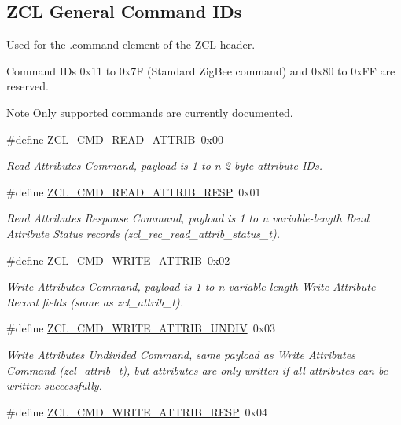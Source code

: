 \subsection*{Z\-C\-L General Command I\-Ds}
\label{_amgrp27eea603d65ab29a11d175579fcb3efa}%
Used for the .command element of the Z\-C\-L header.

Command I\-Ds 0x11 to 0x7\-F (Standard Zig\-Bee command) and 0x80 to 0x\-F\-F are reserved.

\begin{DoxyNote}{Note}
Only supported commands are currently documented. 
\end{DoxyNote}
\begin{DoxyCompactItemize}
\item 
\hypertarget{group__zcl_ga7a3d858b466e4202c6f2148a1b6a3eb2}{\#define \hyperlink{group__zcl_ga7a3d858b466e4202c6f2148a1b6a3eb2}{Z\-C\-L\-\_\-\-C\-M\-D\-\_\-\-R\-E\-A\-D\-\_\-\-A\-T\-T\-R\-I\-B}~0x00}\label{group__zcl_ga7a3d858b466e4202c6f2148a1b6a3eb2}

\begin{DoxyCompactList}\small\item\em Read Attributes Command, payload is 1 to n 2-\/byte attribute I\-Ds. \end{DoxyCompactList}\item 
\#define \hyperlink{group__zcl_ga85ca2068c5dc26db307b60b0ac54bc9c}{Z\-C\-L\-\_\-\-C\-M\-D\-\_\-\-R\-E\-A\-D\-\_\-\-A\-T\-T\-R\-I\-B\-\_\-\-R\-E\-S\-P}~0x01
\begin{DoxyCompactList}\small\item\em Read Attributes Response Command, payload is 1 to n variable-\/length Read Attribute Status records (zcl\-\_\-rec\-\_\-read\-\_\-attrib\-\_\-status\-\_\-t). \end{DoxyCompactList}\item 
\#define \hyperlink{group__zcl_ga8843c2bcb861c091ae6f9a4e36f7e4d8}{Z\-C\-L\-\_\-\-C\-M\-D\-\_\-\-W\-R\-I\-T\-E\-\_\-\-A\-T\-T\-R\-I\-B}~0x02
\begin{DoxyCompactList}\small\item\em Write Attributes Command, payload is 1 to n variable-\/length Write Attribute Record fields (same as zcl\-\_\-attrib\-\_\-t). \end{DoxyCompactList}\item 
\#define \hyperlink{group__zcl_ga9d67bef86e1ec74d60c06e1a09cfb86a}{Z\-C\-L\-\_\-\-C\-M\-D\-\_\-\-W\-R\-I\-T\-E\-\_\-\-A\-T\-T\-R\-I\-B\-\_\-\-U\-N\-D\-I\-V}~0x03
\begin{DoxyCompactList}\small\item\em Write Attributes Undivided Command, same payload as Write Attributes Command (zcl\-\_\-attrib\-\_\-t), but attributes are only written if all attributes can be written successfully. \end{DoxyCompactList}\item 
\hypertarget{group__zcl_ga0595c0f6957be4e80265ecd36158c0ae}{\#define \hyperlink{group__zcl_ga0595c0f6957be4e80265ecd36158c0ae}{Z\-C\-L\-\_\-\-C\-M\-D\-\_\-\-W\-R\-I\-T\-E\-\_\-\-A\-T\-T\-R\-I\-B\-\_\-\-R\-E\-S\-P}~0x04}\label{group__zcl_ga0595c0f6957be4e80265ecd36158c0ae}


\end{DoxyCompactItemize}
